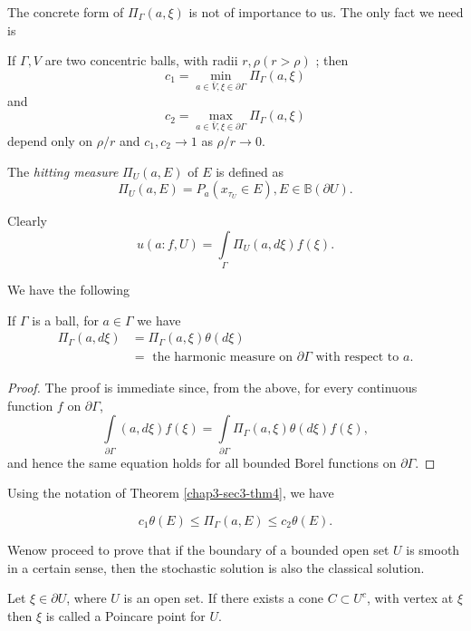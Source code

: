 The concrete form of $\Pi_\Gamma (a, \xi)$ is not of importance to
us. The only fact we need is  

\begin{thm}\label{chap3-sec3-thm4} %
  If $\Gamma, V$ are two concentric balls, with radii $r, \rho (r >
  \rho)$ ; then 
  $$
   c_1  = \min_{a \in \bar{V}, \xi \in \partial \Gamma} \Pi_\Gamma (a,
    \xi)
$$
and\pageoriginale
$$
c_2   = \max\limits_{a \in \bar{V}, \xi \in
      \partial \Gamma} \Pi_\Gamma (a, \xi)
$$
depend only on $\rho/r$ and $c_1, c_2 \to 1$ as $\rho/r \to 0$.
\end{thm}

The \textit{hitting measure} $\Pi_U (a, E)$ of $E$ is defined as
$$
\Pi_U (a, E) = P_a(x_{\tau_U} \in E), E \in \mathbb{B} (\partial U).
$$

Clearly
$$
u(a : f, U) = \int\limits_{\Gamma}\Pi_U (a, d \xi) f(\xi).
$$

We have the following
\begin{thm}\label{chap3-sec3-thm5}%
  If $\Gamma$ is a ball, for $a \in \Gamma$ we have
  \begin{align*}
    \Pi_\Gamma (a, d \xi) & = \Pi_\Gamma (a, \xi) \theta (d \xi) \\
    & = \text{ the harmonic measure on }\partial \Gamma \text{ with
      respect to } a. 
  \end{align*}
\end{thm}

\begin{proof}
The proof is immediate since, from the above, for every continuous
  function $f$ on $\partial \Gamma$, 
$$
  \int\limits_{\partial \Gamma} (a, d\xi) f(\xi) = \int \limits
  _{\partial \Gamma} \Pi_\Gamma (a, \xi) \theta (d \xi) f (\xi), 
$$
and hence the same equation holds for all bounded Borel functions on
  $\partial \Gamma$. 
\end{proof}

Using the notation of Theorem \ref{chap3-sec3-thm4}, we have
\begin{thm}%
$$
c_1 \theta(E) \leq \Pi_\Gamma (a, E) \leq c_2 \theta (E).
$$
\end{thm}

We\pageoriginale now proceed to prove that if the boundary of a
bounded open set $U$ 
is smooth in a certain sense, then the stochastic solution is also the
classical solution.
 
\begin{defi*}
  Let $\xi \in \partial U$, where $U$ is an open set. If there exists
  a cone $C \subset U^c$, with vertex at $\xi$ then $\xi$ is called a
  Poincare point for $U$. 
\end{defi*}

